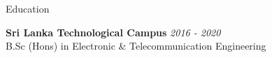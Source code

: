 \documentclass[
	11pt, %
]{./assets/resume} %
\begin{document}

\begin{rSection}{Education}

	\textbf{Sri Lanka Technological Campus} \hfill \textit{2016 - 2020} \\ 
    B.Sc (Hons) in Electronic \& Telecommunication Engineering
	
\end{rSection}

\end{document}
